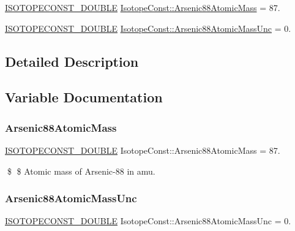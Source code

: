 \begin{DoxyCompactItemize}
\item 
\mbox{\hyperlink{group___isotope_const-_macros_ga8f45a7272ce02c0b4c65c44636ed719a}{I\+S\+O\+T\+O\+P\+E\+C\+O\+N\+S\+T\+\_\+\+D\+O\+U\+B\+LE}} \mbox{\hyperlink{group___isotope_const-_arsenic-_as88_ga67692d2990765301e99e2ac61dc3fb1f}{Isotope\+Const\+::\+Arsenic88\+Atomic\+Mass}} = 87.
\item 
\mbox{\hyperlink{group___isotope_const-_macros_ga8f45a7272ce02c0b4c65c44636ed719a}{I\+S\+O\+T\+O\+P\+E\+C\+O\+N\+S\+T\+\_\+\+D\+O\+U\+B\+LE}} \mbox{\hyperlink{group___isotope_const-_arsenic-_as88_gadfaa471ccd49bc83071b410b8e513bc2}{Isotope\+Const\+::\+Arsenic88\+Atomic\+Mass\+Unc}} = 0.
\end{DoxyCompactItemize}


\subsection{Detailed Description}


\subsection{Variable Documentation}
\mbox{\label{group___isotope_const-_arsenic-_as88_ga67692d2990765301e99e2ac61dc3fb1f}} 
\subsubsection{\texorpdfstring{Arsenic88\+Atomic\+Mass}{Arsenic88AtomicMass}}
{\footnotesize\ttfamily \mbox{\hyperlink{group___isotope_const-_macros_ga8f45a7272ce02c0b4c65c44636ed719a}{I\+S\+O\+T\+O\+P\+E\+C\+O\+N\+S\+T\+\_\+\+D\+O\+U\+B\+LE}} Isotope\+Const\+::\+Arsenic88\+Atomic\+Mass = 87.}

\$ \$ Atomic mass of Arsenic-\/88 in amu. \mbox{\label{group___isotope_const-_arsenic-_as88_gadfaa471ccd49bc83071b410b8e513bc2}} 
\subsubsection{\texorpdfstring{Arsenic88\+Atomic\+Mass\+Unc}{Arsenic88AtomicMassUnc}}
{\footnotesize\ttfamily \mbox{\hyperlink{group___isotope_const-_macros_ga8f45a7272ce02c0b4c65c44636ed719a}{I\+S\+O\+T\+O\+P\+E\+C\+O\+N\+S\+T\+\_\+\+D\+O\+U\+B\+LE}} Isotope\+Const\+::\+Arsenic88\+Atomic\+Mass\+Unc = 0.}

